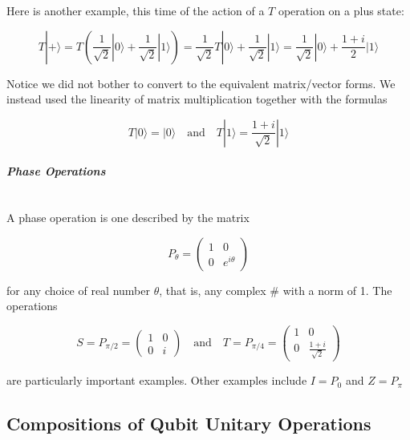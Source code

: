 \documentclass[svgnames]{article}     %
\begin{document}
  Here is another example, this time of the action of a $T$ operation on a plus
  state: 

  \[
    T|+\rangle = T\left( \frac{1}{\sqrt{2}} |0\rangle + \frac{1}{\sqrt{2}}|1\rangle \right) = \frac{1}{\sqrt{2}}T|0\rangle + \frac{1}{\sqrt{2}}|1\rangle = \frac{1}{\sqrt{2}} |0\rangle + \frac{1+i}{2}|1\rangle
  \] \vspace{5px}
  
Notice we did not bother to convert to the equivalent matrix/vector forms. We instead used the linearity of matrix multiplication together with the formulas

\[
  T|0\rangle = |0\rangle \quad \text{and} \quad T|1\rangle = \frac{1+i}{\sqrt{2}}|1\rangle
\] \vspace{5px}



\paragraph{\textit{Phase Operations}} \mbox{} \\

A phase operation is one described by the matrix 

\[
P_\theta = \begin{pmatrix}
  1 & 0 \\[2px]
  0 & e^{i\theta} 
\end{pmatrix} 
\] \vspace{5px}

for any choice of real number $\theta$, that is, any complex \# with a norm of
1. The operations 

\[
  S = P_{\pi / 2} = \begin{pmatrix}
    1 & 0 \\[4px]
    0 & i 
  \end{pmatrix} \quad \text{and}\quad T = P_{\pi / 4} = \begin{pmatrix}
    1 & 0 \\[4px]
    0 & \frac{1+i}{\sqrt{2}} 
  \end{pmatrix}  \] \vspace{5px}

are particularly important examples. Other examples include $I = P_0$ and $Z
= P_\pi$

\subsection{Compositions of Qubit Unitary Operations} 
\end{document}
